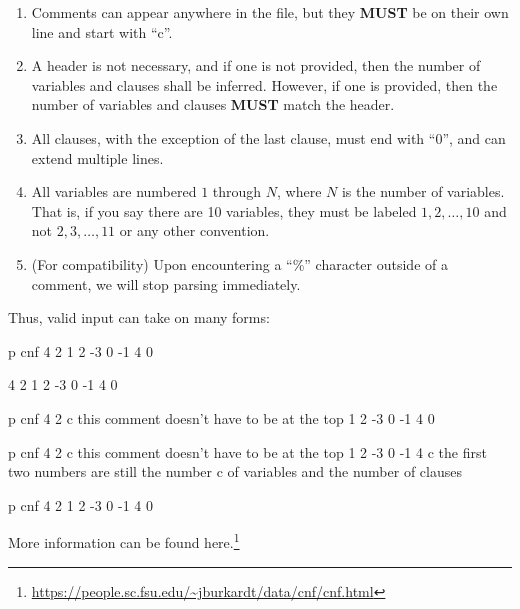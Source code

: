 \begin{enumerate}
    \item Comments can appear anywhere in the file, but they \textbf{MUST}
    be on their own line and start with ``c''.

    \item A header is not necessary, and if one is not provided, then the
    number of variables and clauses shall be inferred. However, if one is
    provided, then the number of variables and clauses \textbf{MUST} match the
    header.

    \item All clauses, with the exception of the last clause, must end with
    ``0'', and can extend multiple lines.

    \item All variables are numbered $1$ through $N$, where $N$ is the number
    of variables. That is, if you say there are 10 variables, they must be
    labeled $1,2,\ldots,10$ and not $2,3,\ldots,11$ or any other convention.

    \item (For compatibility) Upon encountering a ``\%'' character outside of
    a comment, we will stop parsing immediately.
\end{enumerate}

Thus, valid input can take on many forms:

\begin{FVerbatim}
p cnf 4 2
1 2 -3 0
-1 4 0
\end{FVerbatim}

\begin{FVerbatim}
4 2
1 2 -3 0
-1 4 0
\end{FVerbatim}

\begin{FVerbatim}
p cnf 4 2
c this comment doesn't have to be at the top
1 2 -3 0
-1 4 0
\end{FVerbatim}

\begin{FVerbatim}
p cnf 4 2
c this comment doesn't have to be at the top
1 2 -3 0
-1 4
c the first two numbers are still the number
c of variables and the number of clauses
\end{FVerbatim}

\begin{FVerbatim}
p cnf 4 2 1 2 -3 0
-1 4 0
\end{FVerbatim}

More information can be found here.\footnote{\url{https://people.sc.fsu.edu/~jburkardt/data/cnf/cnf.html}}

